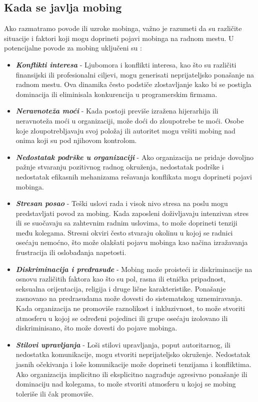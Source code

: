 \documentclass[a4paper]{article}
\begin{document}
    \subsection{Kada se javlja mobing}
        Ako razmatramo povode ili uzroke mobinga, važno je razumeti da su različite situacije i faktori koji mogu doprineti pojavi mobinga na radnom mestu.
        U potencijalne povode za mobing uključeni su \cite{ELCI2014455, ERGIN2023115595, ERTURK20143669, VARAHORNA2023e21096}:
        \begin{itemize}
            \item \textbf{\textit{Konflikti interesa}} - Ljubomora i konflikti interesa, kao što su različiti finansijski ili profesionalni ciljevi, mogu generisati neprijateljsko ponašanje na radnom mestu. Ova dinamika često podstiče zlostavljanje kako bi se postigla dominacija ili eliminisala konkurencija u programerskim firmama.
            \item \textbf{\textit{Neravnoteža moći}} - Kada postoji previše izražena hijerarhija ili neravnoteža moći u organizaciji, može doći do zloupotrebe te moći. Osobe koje zloupotrebljavaju svoj položaj ili autoritet mogu vršiti mobing nad onima koji su pod njihovom kontrolom.
            \item \textbf{\textit{Nedostatak podrške u organizaciji}} - Ako organizacija ne pridaje dovoljno pažnje stvaranju pozitivnog radnog okruženja, nedostatak podrške i nedostatak efikasnih mehanizama rešavanja konflikata mogu doprineti pojavi mobinga.
            \item \textbf{\textit{Stresan posao}} - Teški uslovi rada i visok nivo stresa na poslu mogu predstavljati povod za mobing. Kada zaposleni doživljavaju intenzivan stres ili se suočavaju sa zahtevnim radnim uslovima, to može doprineti tenziji među kolegama. Stresni okviri često stvaraju okolinu u kojoj se radnici osećaju nemoćno, što može olakšati pojavu mobinga kao načina izražavanja frustracija ili oslobađanja napetosti.
            \item \textbf{\textit{Diskriminacija i predrasude}} - Mobing može proisteći iz diskriminacije na osnovu različitih faktora kao što su pol, rasna ili etnička pripadnost, seksualna orijentacija, religija i druge lične karakteristike. Ponašanje zasnovano na predrasudama može dovesti do sistematskog uznemiravanja. Kada organizacija ne promoviše raznolikost i inkluzivnost, to može stvoriti atmosferu u kojoj se određeni pojedinci ili grupe osećaju izolovano ili diskriminisano, što može dovesti do pojave mobinga.
            \item \textbf{\textit{Stilovi upravljanja}} - Loši stilovi upravljanja, poput autoritarnog, ili nedostatka komunikacije, mogu stvoriti neprijateljsko okruženje. Nedostatak jasnih očekivanja i loše komunikacije može doprineti tenzijama i konfliktima. Ako organizacija implicitno ili eksplicitno nagrađuje agresivno ponašanje ili dominaciju nad kolegama, to može stvoriti atmosferu u kojoj se mobing toleriše ili čak promoviše.

\end{itemize}
\end{document}
